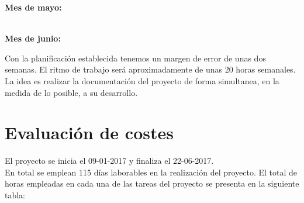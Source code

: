 \documentclass[12pt, a4paper]{book}
\def\GanttHeader#1#2#3#4{%
	\pgfmathparse{(#1-#2-#3)/#4}
	\tikzset{y=7mm, task number/.style={left, font=\bfseries},
		task description/.style={text width=#3,  right, draw=none,
			font=\sffamily, xshift=#2,
			minimum height=2em},
		gantt bar/.style={draw=black, fill=blue!30},
		help lines/.style={draw=black!30, dashed},
		x=\pgfmathresult pt
	}
	\def\totalmonths{#4}
	\node (Header) [task description] at (0,0) {\textbf{\large Tareas}};
	\begin{scope}[shift=($(Header.south east)$)]
		\foreach \x in {1,...,#4}
		\node[above] at (\x,0) {\footnotesize\x};
	\end{scope}
}
\def\Task#1#2#3#4{%
	\node[task number] at ($(Header.west) + (0, -#1)$) {#1};
	\node[task description] at (0,-#1) {#2};
	\begin{scope}[shift=($(Header.south east)$)]
		\draw (0,-#1) rectangle +(\totalmonths, 1);
		\foreach \x in {1,...,\totalmonths}
		\draw[help lines] (\x,-#1) -- +(0,1);
		\filldraw[gantt bar] ($(#3, -#1+0.2)$) rectangle +(#4,0.6);
	\end{scope}
}
\begin{document}
\begin{landscape}
	\textbf{Mes de mayo:}\\
	
	\\
	
	\textbf{Mes de junio:}\\
	
	
	
\end{landscape} 
\newpage


Con la planificación establecida tenemos un margen de error de unas dos semanas. El ritmo de trabajo será aproximadamente de unas 20 horas semanales.\\

La idea es realizar la documentación del proyecto de forma simultanea, en la medida de lo posible, a su desarrollo.

\section{Evaluación de costes}

El proyecto se inicia el 09-01-2017 y finaliza el 22-06-2017.\\

En total se emplean 115 días laborables en la realización del proyecto. El total de horas empleadas en cada una de las tareas del proyecto se presenta en la siguiente tabla: \\
\end{document}

